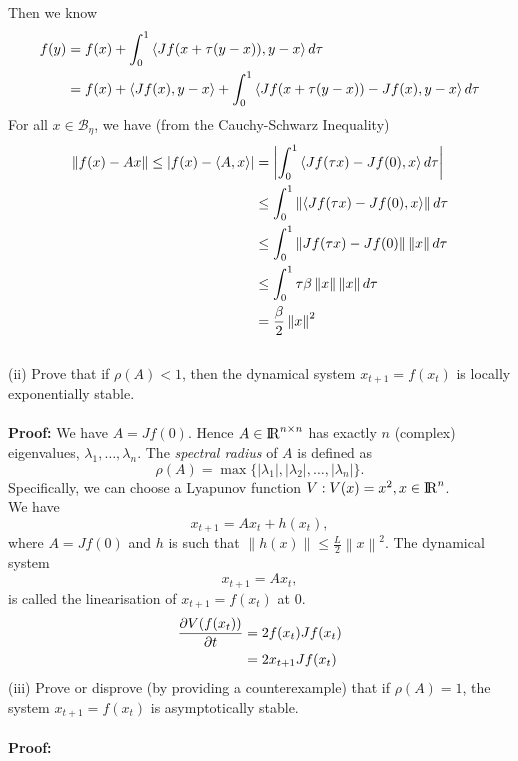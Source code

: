 \documentclass[a4paper,11pt,reqno]{amsart}
\newcommand{\R}{{\rm I\!R}}
\begin{document}
Then we know \cite{Optimization}
\begin{align}
    f(y)&=f(x)+\int_{0}^{1}\left\langle Jf(x+\tau(y-x)),y-x \right \rangle d\tau
    \notag\\
    &=f(x)+\left \langle Jf(x),y-x \right \rangle+\int_{0}^{1}\left\langle Jf(x+\tau(y-x))-Jf(x),y-x \right \rangle d\tau
\end{align}
For all $x\in \mathcal{B}_{\eta}$, we have (from the Cauchy-Schwarz Inequality)
\begin{align}
    \left\lVert f(x)-Ax\right\rVert\leq\left\lvert f(x)-\left \langle A,x \right \rangle\right\rvert &=\left\lvert \int_{0}^{1}\left\langle Jf(\tau x)-Jf(0),x \right \rangle d\tau\right\rvert 
    \notag\\
    &\leq \int_{0}^{1}\left\lVert \left\langle Jf(\tau x)-Jf(0),x \right \rangle \right\rVert d\tau
    \notag\\
    &\leq \int_{0}^{1}\left\lVert Jf(\tau x)-Jf(0) \right\rVert \left\lVert x\right\rVert d\tau
    \notag\\
    &\leq \int_{0}^{1}\tau\beta\left\lVert x \right\rVert \left\lVert x\right\rVert d\tau
    \notag\\
    &=\frac{\beta}{2}\left\lVert x \right\rVert ^2
\end{align}
\
\\
(ii) Prove that if $\rho(A)<1$, then the dynamical system $x_{t+1}=f(x_t)$ is locally exponentially stable.
\\ \\
\textbf{Proof:} 
We have $A=Jf(0)$. Hence $A\in \R^{n\times n}$ has exactly $n$ (complex) eigenvalues, $\lambda_1,\ldots,\lambda_n$. The \textit{spectral radius} of $A$
is defined as
\begin{equation}
    \rho(A)=\max\{\left\lvert \lambda_1\right\rvert, \left\lvert \lambda_2\right\rvert,\ldots, \left\lvert \lambda_n\right\rvert \}.
\end{equation}
Specifically, we can choose a Lyapunov function $V: V(x)=x^2, x\in\R^n$.
\\
We have
\begin{equation}
    x_{t+1}=Ax_t+h(x_t),
\end{equation}
where $A=Jf(0)$ and $h$ is such that $\left\lVert h(x)\right\rVert \leq \frac{L}{2}\left\lVert x\right\rVert ^2$. The dynamical system
\begin{equation}
    x_{t+1}=Ax_t,
\end{equation}
is called the linearisation of $x_{t+1}=f(x_t)$ at 0.
\begin{align}
    \frac{\partial V(f(x_t))}{\partial t}&=2f(x_t)Jf(x_t)
    \notag\\
    &=2x_{t+1}Jf(x_t)
\end{align}
(iii) Prove or disprove (by providing a counterexample) that if $\rho(A)=1$, the system $x_{t+1}=f(x_t)$ is asymptotically stable.
\\ \\
\textbf{Proof:} 
\\ \\
\end{document}
